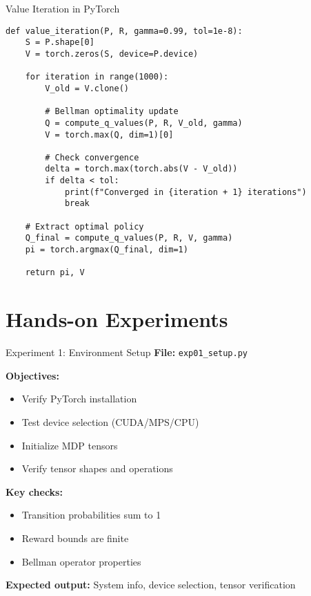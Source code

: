 \documentclass[aspectratio=169,10pt]{beamer}
\begin{document}
\begin{frame}[fragile]{Value Iteration in PyTorch}
\begin{lstlisting}
def value_iteration(P, R, gamma=0.99, tol=1e-8):
    S = P.shape[0]
    V = torch.zeros(S, device=P.device)
    
    for iteration in range(1000):
        V_old = V.clone()
        
        # Bellman optimality update
        Q = compute_q_values(P, R, V_old, gamma)
        V = torch.max(Q, dim=1)[0]
        
        # Check convergence
        delta = torch.max(torch.abs(V - V_old))
        if delta < tol:
            print(f"Converged in {iteration + 1} iterations")
            break
    
    # Extract optimal policy
    Q_final = compute_q_values(P, R, V, gamma)
    pi = torch.argmax(Q_final, dim=1)
    
    return pi, V
\end{lstlisting}
\end{frame}

\section{Hands-on Experiments}

\begin{frame}{Experiment 1: Environment Setup}
\textbf{File:} \texttt{exp01\_setup.py}

\textbf{Objectives:}
\begin{itemize}
    \item Verify PyTorch installation
    \item Test device selection (CUDA/MPS/CPU)
    \item Initialize MDP tensors
    \item Verify tensor shapes and operations
\end{itemize}

\textbf{Key checks:}
\begin{itemize}
    \item Transition probabilities sum to 1
    \item Reward bounds are finite
    \item Bellman operator properties
\end{itemize}

\textbf{Expected output:} System info, device selection, tensor verification
\end{frame}
\end{document}
